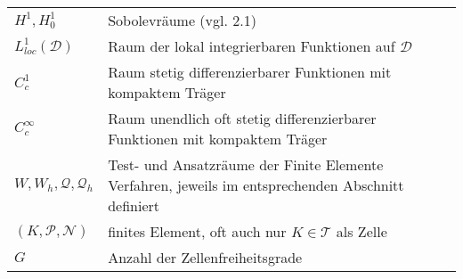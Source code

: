 \begin{longtable}[c]{ p{} p{}}
	$ H^1,H_0^1$ & Sobolevräume (vgl. 2.1) \\
	$ L^1_{loc}(\mathcal{ D}) $ & Raum der lokal integrierbaren Funktionen auf $ \mathcal{ D} $ \\
	$ C_c^{1} $ & Raum stetig differenzierbarer Funktionen mit kompaktem  Träger \\
	$ C_c^{\infty} $ & Raum unendlich oft stetig differenzierbarer Funktionen mit kompaktem  Träger \\
	$ W,W_h,\mathcal{Q},\mathcal{Q}_h $ & Test- und Ansatzräume der Finite Elemente Verfahren, jeweils im entsprechenden Abschnitt definiert\\
	$ (K,\mathcal{P},\mathcal{N}) $ & finites Element, oft auch nur $ K \in \mathcal{T}$ als Zelle \\
	$ G $ & Anzahl der Zellenfreiheitsgrade \\
	\hline
\end{longtable}

